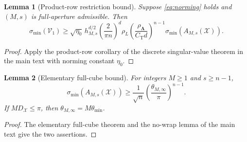\documentclass[11pt]{article}
\newtheorem{lemma}{Lemma}
\newcommand{\V}{\mathcal V}
\newcommand{\X}{\mathcal X}
\begin{document}
\begin{lemma}[Product-row restriction bound]\label{lem:restriction}
Suppose \eqref{eq:norming} holds and $(M,s)$ is full-aperture admissible. Then
\begin{equation}\label{eq:restriction-bound}
\sigma_{\min}(\V_1)\ge\sqrt{\eta_0}\,h_{M,s}^{d/2}\left(\frac2{\pi n}\right)^d\rho_L\left(\frac{\rho_{\bm\Lambda}}{C_{\mathrm T}d}\right)^{n-1}\sigma_{\min}(A_{M,s}(\X)).
\end{equation}
\end{lemma}
\begin{proof}
Apply the product-row corollary of the discrete singular-value theorem in the main text with norming constant $\eta_0$.
\end{proof}

\begin{lemma}[Elementary full-cube bound]\label{lem:elementary}
For integers $M\ge1$ and $s\ge n-1$,
\begin{equation}\label{eq:elementary}
\sigma_{\min}(A_{M,s}(\X))\ge\frac1{\sqrt n}\left(\frac{\theta_{M,\infty}}\pi\right)^{n-1}.
\end{equation}
If $MD_\X\le\pi$, then $\theta_{M,\infty}=M\theta_{\min}$.
\end{lemma}
\begin{proof}
The elementary full-cube theorem and the no-wrap lemma of the main text give the two assertions.
\end{proof}
\end{document}

